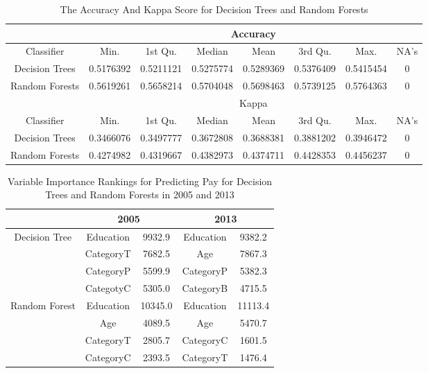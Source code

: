 \documentclass{article}
\begin{document}
    \begin{center}
        \begin{table}
            \centering
            \begin{tabular}{ |c|c|c|c|c|c|c|c| }
                \hline
                & \multicolumn{7}{|c|}{Accuracy} \\
                \hline
                Classifier & Min. & 1st Qu. & Median & Mean & 3rd Qu. & Max. & NA's \\
                Decision Trees & 0.5176392 & 0.5211121 & 0.5275774 & 0.5289369 & 0.5376409 & 0.5415454 & 0 \\
                Random Forests & 0.5619261 & 0.5658214 & 0.5704048 & 0.5698463 & 0.5739125 & 0.5764363 & 0 \\
                \hline
                & \multicolumn{7}{|c|}{Kappa} \\
                \hline
                Classifier & Min. & 1st Qu. & Median & Mean & 3rd Qu. & Max. & NA's \\
                Decision Trees & 0.3466076 & 0.3497777 & 0.3672808 & 0.3688381 & 0.3881202 & 0.3946472 & 0 \\
                Random Forests & 0.4274982 & 0.4319667 & 0.4382973 & 0.4374711 & 0.4428353 & 0.4456237 & 0 \\
                \hline
            \end{tabular}
            \caption{The Accuracy And Kappa Score for Decision Trees and Random Forests}
            \label{tab:7}
        \end{table}
    \end{center}

    \begin{center}
        \begin{table}
            \centering
            \begin{tabular}{ |c|c|c|c|c| }
                \hline
                & \multicolumn{2}{|c|}{2005} & \multicolumn{2}{|c|}{2013} \\
                \hline
                Decision Tree & Education & 9932.9 & Education & 9382.2 \\
                & CategoryT & 7682.5 & Age & 7867.3 \\
                & CategoryP & 5599.9 & CategoryP & 5382.3 \\
                & CategotyC & 5305.0 & CategoryB & 4715.5 \\
                \hline
                Random Forest & Education & 10345.0 & Education & 11113.4 \\
                & Age & 4089.5 & Age & 5470.7 \\
                & CategoryT & 2805.7 & CategoryC & 1601.5 \\
                & CategoryC & 2393.5 & CategoryT & 1476.4 \\
                \hline
            \end{tabular}
            \caption{Variable Importance Rankings for Predicting Pay for Decision Trees and Random Forests in 2005 and 2013}
            \label{tab:8}
        \end{table}
    \end{center}
\end{document}

